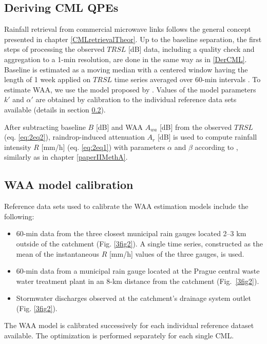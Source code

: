 \documentclass{ctuthesis}\usepackage[]{graphicx}\usepackage[]{color}
\begin{document}
\subsection{Deriving CML QPEs} \label{pIII_derivQPEs}
Rainfall retrieval from commercial microwave links follows the general concept presented in chapter  \ref{CMLretrievalTheor}. Up to the baseline separation, the first steps of processing the observed  $T\!R\!S\!L$ [dB]  data, including a quality check and aggregation to a 1-min resolution, are done in the same way as in \ref{DerCML}. Baseline is estimated as a moving median with a centered window having the length of 1 week applied on $T\!R\!S\!L$  time series averaged over 60-min intervals \citep{fenclAtmosphericObservationsEband2020}. To estimate WAA, we use the model proposed by \cite[][see Eq. \ref{eq:II_1}]{valtrExcessAttenuationCaused2019}. Values of the model parameters $k'$ and $\alpha'$ are obtained by calibration to the individual reference data sets available (details in section \ref{pIII_cal}). 

After subtracting baseline $B$ [dB] and WAA $A_{wa}$ [dB] from the observed $T\!R\!S\!L$ (eq. \ref{eq:2eq2}), raindrop-induced attenuation $A_r$ [dB] is used to compute rainfall intensity $R$ [mm/h] (eq. \ref{eq:2eq1}) with parameters $\alpha$ and $\beta$ according to \cite{recommendation2005838}, similarly as in chapter \ref{paperIIMethA}.


\subsection{WAA model calibration} \label{pIII_cal}
Reference data sets used to calibrate the WAA estimation models include the following:
\begin{itemize}
        \item 60-min data from the three closest municipal rain gauges located 2--3 km outside of the catchment (Fig. \ref{3fig2}). A single time series, constructed as the mean of the instantaneous $R$ [mm/h] values of the three gauges, is used.
        \item 60-min data from a municipal rain gauge located at the Prague central waste water treatment plant in an 8-km distance from the catchment (Fig.~\ref{3fig2}).
        \item Stormwater discharges observed at the catchment's drainage system outlet (Fig. \ref{3fig2}).
\end{itemize}


The WAA model is calibrated successively for each individual reference dataset available. The optimization is performed separately for each single CML. 
\end{document}
